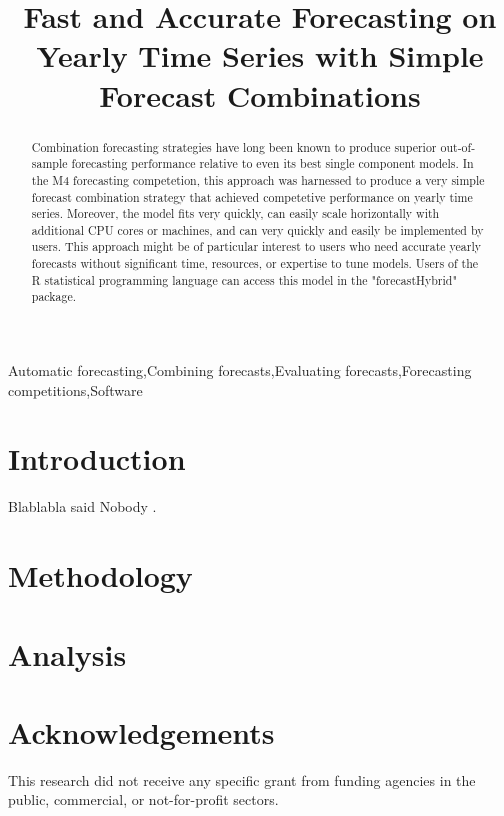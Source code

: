 \documentclass[11pt,3p,review,authoryear]{elsarticle}
\begin{document}
\begin{frontmatter}

\title{Fast and Accurate Forecasting on Yearly Time Series with Simple Forecast Combinations}





\begin{abstract}
Combination forecasting strategies have long been known to produce superior out-of-sample forecasting performance relative to even its best single component models. In the M4 forecasting competetion, this approach was harnessed to produce a very simple forecast combination strategy that achieved competetive performance on yearly time series. Moreover, the model fits very quickly, can easily scale horizontally with additional CPU cores or machines, and can very quickly and easily be implemented by users. This approach might be of particular interest to users who need accurate yearly forecasts without significant time, resources, or expertise to tune models. Users of the R statistical programming language can access this model in the "forecastHybrid" package.
\end{abstract}

\begin{keyword}
Automatic forecasting\sep Combining forecasts\sep Evaluating forecasts\sep Forecasting competitions\sep Software
\end{keyword}

\end{frontmatter}


\section{Introduction}

Blablabla said Nobody \citep{Forecasthybrid}.

\section{Methodology}

\section{Analysis}

\section*{Acknowledgements}

This research did not receive any specific grant from funding agencies in the public, commercial, or not-for-profit sectors.



\end{document}
